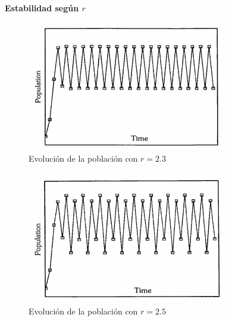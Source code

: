\documentclass[8pt]{beamer}
\begin{document}
\begin{frame}
\framesubtitle{Estabilidad según $r$}

\begin{minipage}{0.32\textwidth}
\begin{figure}[hbtp]
\centering
\includegraphics[width = \textwidth]{img/r2_3.png}
\caption{Evolución de la población con $r=2.3$}
\label{fig:r2_3}
\end{figure}
\end{minipage}
\begin{minipage}{0.32\textwidth}
\begin{figure}[hbtp]
\centering
\includegraphics[width = \textwidth]{img/r2_5.png}
\caption{Evolución de la población con $r=2.5$}
\label{fig:r2_5}
\end{figure}
\end{minipage}
\begin{minipage}{0.32\textwidth}
\begin{figure}[hbtp]

\end{figure}
\end{minipage}
\end{frame}
\end{document}
